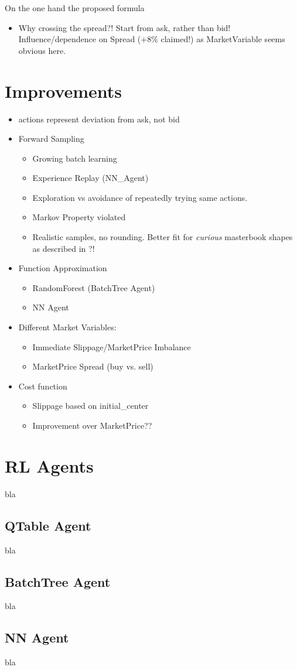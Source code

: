 On the one hand the proposed formula  

\begin{itemize}
\item Why crossing the spread?! Start from ask, rather than bid!\\
Influence/dependence on Spread (+8\% claimed!) as MarketVariable seems obvious here.
\end{itemize}


\section{Improvements}
\begin{itemize}
\item actions represent deviation from ask, not bid
\item Forward Sampling
\begin{itemize}
\item Growing batch learning
\item Experience Replay (NN\_Agent)
\item Exploration vs avoidance of repeatedly trying same actions.
\end{itemize}
\begin{itemize}
\item Markov Property violated
\item Realistic samples, no rounding. Better fit for \emph{curious} masterbook shapes as described in ?!
\end{itemize}
\item Function Approximation
\begin{itemize}
\item RandomForest (BatchTree Agent)
\item NN Agent
\end{itemize}
\item Different Market Variables:
\begin{itemize}
\item Immediate Slippage/MarketPrice Imbalance
\item MarketPrice Spread (buy vs. sell)
\end{itemize}
\item Cost function
\begin{itemize}
\item Slippage based on initial\_center
\item Improvement over MarketPrice??
\end{itemize}
\end{itemize}

\section{RL Agents}
bla

\subsection{QTable Agent}
bla

\subsection{BatchTree Agent}
bla

\subsection{NN Agent}
bla

\cleardoublepage{}